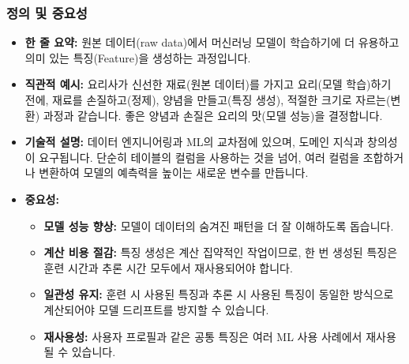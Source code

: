 \documentclass[11pt,a4paper]{article}
\begin{document}
\subsubsection*{정의 및 중요성}
\begin{itemize}
    \item \textbf{한 줄 요약:} 원본 데이터(raw data)에서 머신러닝 모델이 학습하기에 더 유용하고 의미 있는 특징(Feature)을 생성하는 과정입니다.
    \item \textbf{직관적 예시:} 요리사가 신선한 재료(원본 데이터)를 가지고 요리(모델 학습)하기 전에, 재료를 손질하고(정제), 양념을 만들고(특징 생성), 적절한 크기로 자르는(변환) 과정과 같습니다. 좋은 양념과 손질은 요리의 맛(모델 성능)을 결정합니다.
    \item \textbf{기술적 설명:} 데이터 엔지니어링과 ML의 교차점에 있으며, 도메인 지식과 창의성이 요구됩니다. 단순히 테이블의 컬럼을 사용하는 것을 넘어, 여러 컬럼을 조합하거나 변환하여 모델의 예측력을 높이는 새로운 변수를 만듭니다.
    \item \textbf{중요성:}
    \begin{itemize}
        \item \textbf{모델 성능 향상:} 모델이 데이터의 숨겨진 패턴을 더 잘 이해하도록 돕습니다.
        \item \textbf{계산 비용 절감:} 특징 생성은 계산 집약적인 작업이므로, 한 번 생성된 특징은 훈련 시간과 추론 시간 모두에서 재사용되어야 합니다.
        \item \textbf{일관성 유지:} 훈련 시 사용된 특징과 추론 시 사용된 특징이 동일한 방식으로 계산되어야 모델 드리프트를 방지할 수 있습니다.
        \item \textbf{재사용성:} 사용자 프로필과 같은 공통 특징은 여러 ML 사용 사례에서 재사용될 수 있습니다.
    \end{itemize}
\end{itemize}
\end{document}
